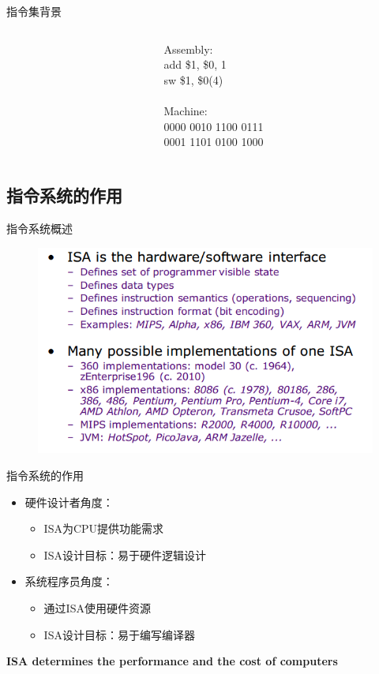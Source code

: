 \documentclass[UTF8]{ctexbeamer}
\begin{document}
\begin{frame}[fragile]{指令集背景}
{\begin{columns}
\begin{column}{0.65\linewidth}
\begin{center}
\end{center}
\end{column}
\begin{column}{0.35\linewidth}
Assembly:\\
add \$1, \$0, 1 \\
sw \$1, \$0(4) \\
\quad\\
Machine:\\
0000 0010 1100 0111 \\
0001 1101 0100 1000
\end{column}
\end{columns}
}
\end{frame}

\subsection{指令系统的作用}
\begin{frame}{指令系统概述}
\begin{figure}
\centering
\includegraphics[width=0.9\linewidth]{fig/Lecture2/overview.PNG}
\end{figure}
\end{frame}

\begin{frame}{指令系统的作用}
\begin{itemize}
	\item 硬件设计者角度：
	\begin{itemize}
		\item ISA为CPU提供功能需求
		\item ISA设计目标：易于硬件逻辑设计
	\end{itemize}
	\item 系统程序员角度：
	\begin{itemize}
		\item 通过ISA使用硬件资源
		\item ISA设计目标：易于编写编译器
	\end{itemize}
\end{itemize}
\begin{center}
\textbf{ISA determines the performance and the cost of computers}
\end{center}
\end{frame}
\end{document}
